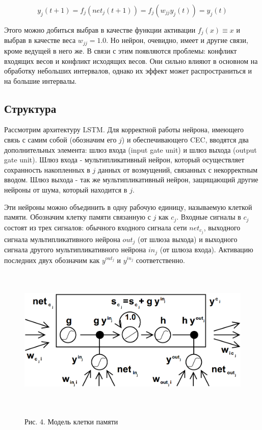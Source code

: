\documentclass[14pt]{article}
\begin{document}
\begin{equation}
y_j(t+1) = f_j(net_j(t+1)) = f_j(w_{jj}y_j(t)) = y_j(t)
\end{equation}

Этого можно добиться выбрав в качестве функции активации $f_j(x) \equiv x$ и выбрав в качестве веса $w_{jj} = 1.0$. Но нейрон, очевидно, имеет и другие связи, кроме ведущей в него же. В связи с этим появляются проблемы: конфликт входящих весов и конфликт исходящих весов. Они сильно влияют в основном на обработку небольших интервалов, однако их эффект может распространиться и на большие интервалы.

\subsection{Структура}
Рассмотрим архитектуру LSTM. Для корректной работы нейрона, имеющего связь с самим собой (обозначим его $j$) и обеспечивающего CEC, вводятся два дополнительных элемента: шлюз входа (input gate unit) и шлюз выхода (output gate unit). Шлюз входа - мультипликативный нейрон, который осуществляет сохранность накопленных в $j$ данных от возмущений, связанных с некорректным вводом. Шлюз выхода - так же  мультипликативный нейрон, защищающий другие нейроны от шума, который находится в $j$.


Эти нейроны можно объединить в одну рабочую единицу, называемую клеткой памяти. Обозначим клетку памяти связанную с $j$ как $c_j$. Входные сигналы в $c_j$ состоят из трех сигналов: обычного входного сигнала сети $net_{c_j}$, выходного сигнала мультипликативного нейрона $out_j$ (от шлюза выхода) и выходного сигнала другого мультипликативного нейрона $in_j$ (от шлюза входа). Активацию последних двух обозначим как $y^{out_j}$ и $y^{in_j}$ соответственно.

\begin{figure}[!h]
    \centering
        \includegraphics[height=7cm]{Fig3.png}
    \parbox[t][1.2cm][c]{16cm}{
        \centering
        Рис. 4. Модель клетки памяти
    }
\end{figure}
\end{document}
